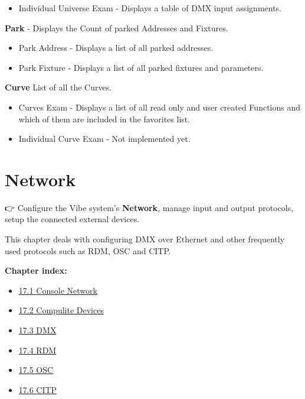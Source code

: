 \documentclass[
]{article}
\providecommand{\tightlist}{%
  \setlength{\itemsep}{0pt}\setlength{\parskip}{0pt}}
\begin{document}
\begin{itemize}
\tightlist
\item
  Individual Universe Exam - Displays a table of DMX input assignments.
\end{itemize}

\textbf{Park} - Displays the Count of parked Addresses and Fixtures.

\begin{itemize}
\item
  Park Address - Displays a list of all parked addresses.
\item
  Park Fixture - Displays a list of all parked fixtures and parameters.
\end{itemize}

\textbf{Curve} List of all the Curves.

\begin{itemize}
\item
  Curves Exam - Displays a list of all read only and user created Functions and which of them are included in the favorites list.
\item
  Individual Curve Exam - {Not implemented yet.}
\end{itemize}

\hypertarget{network}{%
\section{Network}\label{network}}

👉 Configure the Vibe system's \textbf{Network}, manage input and output protocols, setup the connected external devices.

This chapter deals with configuring DMX over Ethernet and other frequently used protocols such as RDM, OSC and CITP.

\textbf{Chapter index:}

\begin{itemize}
\tightlist
\item
  \protect\hyperlink{Console-Network-17.1}{17.1 Console Network}
\item
  \protect\hyperlink{Compulite-Devices-17.2}{17.2 Compulite Devices}
\item
  \protect\hyperlink{DMX-17.3}{17.3 DMX}
\item
  \protect\hyperlink{RDM-17.4}{17.4 RDM}
\item
  \protect\hyperlink{OSC-17.5}{17.5 OSC}
\item
  \protect\hyperlink{CITP-17.6}{17.6 CITP}
\end{itemize}
\end{document}
